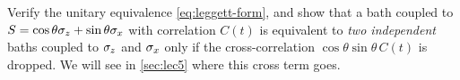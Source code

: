 \begin{exercise}\label{ex:2-4}
Verify the unitary equivalence \cref{eq:leggett-form}, and show that a bath coupled to $S=\cos\theta\sigma_z+\sin\theta\sigma_x$ with correlation $C(t)$ is equivalent to \emph{two independent} baths coupled to $\sigma_z$ and $\sigma_x$ only if the cross-correlation $\cos\theta\sin\theta\,C(t)$ is dropped.
We will see in \cref{sec:lec5} where this cross term goes.
\end{exercise}

\clearpage
